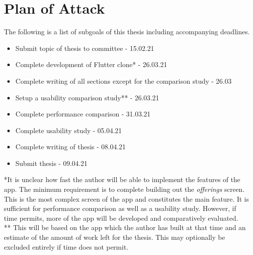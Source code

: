 \section{Plan of Attack}
\label{section:planofattack}
The following is a list of subgoals of this thesis including accompanying deadlines.

\begin{itemize}
    \item Submit topic of thesis to committee - 15.02.21
    \item Complete development of Flutter clone* - 26.03.21
    \item Complete writing of all sections except for the comparison study - 26.03
    \item Setup a usability comparison study** - 26.03.21
    \item Complete performance comparison - 31.03.21
    \item Complete usability study - 05.04.21
    \item Complete writing of thesis - 08.04.21
    \item Submit thesis - 09.04.21
    
\end{itemize}

*It is unclear how fast the author will be able to implement the features of the app. The minimum requirement is to complete building out the \textit{offerings} screen. This is the most complex screen of the app and constitutes the main feature. It is sufficient for performance comparison as well as a usability study. However, if time permits, more of the app will be developed and comparatively evaluated. \\

** This will be based on the app which the author has built at that time and an estimate of the amount of work left for the thesis. This may optionally be excluded entirely if time does not permit.